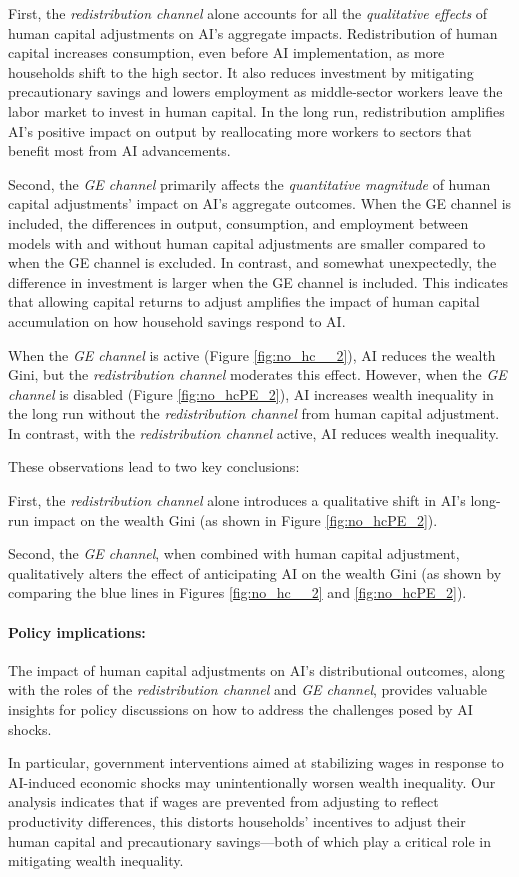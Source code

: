 \documentclass[12pt]{article}
\begin{document}
First, the \textit{redistribution channel} alone accounts for all the \textit{qualitative effects} of human capital adjustments on AI's aggregate impacts.  Redistribution of human capital increases consumption, even before AI implementation, as more households shift to the high sector. It also reduces investment by mitigating precautionary savings and lowers employment as middle-sector workers leave the labor market to invest in human capital. In the long run, redistribution amplifies AI's positive impact on output by reallocating more workers to sectors that benefit most from AI advancements.

Second, the \textit{GE channel} primarily affects the \textit{quantitative magnitude} of human capital adjustments' impact on AI's aggregate outcomes. When the GE channel is included, the differences in output, consumption, and employment between models with and without human capital adjustments are smaller compared to when the GE channel is excluded. In contrast, and somewhat unexpectedly, the difference in investment is larger when the GE channel is included. This indicates that allowing capital returns to adjust amplifies the impact of human capital accumulation on how household savings respond to AI.

When the \textit{GE channel} is active (Figure \ref{fig:no_hc__2}), AI reduces the wealth Gini, but the \textit{redistribution channel} moderates this effect. However, when the \textit{GE channel} is disabled (Figure \ref{fig:no_hcPE_2}), AI increases wealth inequality in the long run without the \textit{redistribution channel} from human capital adjustment. In contrast, with the \textit{redistribution channel} active, AI reduces wealth inequality.

These observations lead to two key conclusions:

First, the \textit{redistribution channel} alone introduces a qualitative shift in AI's long-run impact on the wealth Gini (as shown in Figure \ref{fig:no_hcPE_2}). 

Second, the \textit{GE channel}, when combined with human capital adjustment, qualitatively alters the effect of anticipating AI on the wealth Gini (as shown by comparing the blue lines in Figures \ref{fig:no_hc__2} and \ref{fig:no_hcPE_2}).

\paragraph{Policy implications:} The impact of human capital adjustments on AI's distributional outcomes, along with the roles of the \textit{redistribution channel} and \textit{GE channel}, provides valuable insights for policy discussions on how to address the challenges posed by AI shocks.

In particular, government interventions aimed at stabilizing wages in response to AI-induced economic shocks may unintentionally worsen wealth inequality. Our analysis indicates that if wages are prevented from adjusting to reflect productivity differences, this distorts households' incentives to adjust their human capital and precautionary savings—both of which play a critical role in mitigating wealth inequality.
\end{document}
